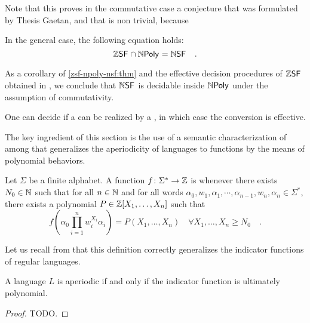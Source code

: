 \documentclass[a4paper,11pt]{article}
\begin{document}
Note that this proves in the commutative case a conjecture that was 
formulated by Thesis Gaetan, and that is non trivial, because 

\begin{conjecture}
    \label{nsf-zsf:conj}
    In the general case, the following equation holds:
    \begin{equation*}
        \ZSF \cap \NPoly
        = 
        \NSF
        \quad .
    \end{equation*}
\end{conjecture}

As a corollary of \cref{zsf-npoly-nsf:thm} and the effective decision
procedures of $\ZSF$ obtained in \cite{LOPEZ23b}, we conclude that $\NSF$ is
decidable inside $\NPoly$ under the assumption of commutativity.

\begin{corollary}
    One can decide if a  
    can be realized by a ,
    in which case the conversion is effective.
\end{corollary}

The key ingredient of this section is the use of a semantic characterization of
 among 
that generalizes the aperiodicity of languages to functions by the means of
polynomial behaviors.

\begin{definition}
    \label{ultimately-polynomial:def}
    Let $\Sigma$ be a finite alphabet. 
    A function $f \colon \Sigma^* \to \mathbb{Z}$
    is 
    whenever there exists $N_0 \in \mathbb{N}$ such that
    for all $n \in \mathbb{N}$
    and for all words $\alpha_0, w_1, \alpha_1, \cdots, \alpha_{n-1}, w_n, \alpha_n
    \in \Sigma^*$, there exists a polynomial $P \in \mathbb{Z}[X_1, \dots, X_n]$
    such that
    \begin{equation*}
        f\left(
            \alpha_0 \prod_{i = 1}^{n} w_i^{X_i} \alpha_i
        \right)
        = 
        P(X_1, \dots, X_n)
        \quad 
        \forall X_1, \dots, X_n \geq N_0
        \quad .
    \end{equation*}
\end{definition}


Let us recall from \cite{LOPEZ23b} that this definition correctly
generalizes the indicator functions of regular languages.

\begin{example}
    A language $L$ is aperiodic if and only if 
    the indicator function is ultimately polynomial.
\end{example}
\begin{proof}
    TODO.
\end{proof}
\end{document}

